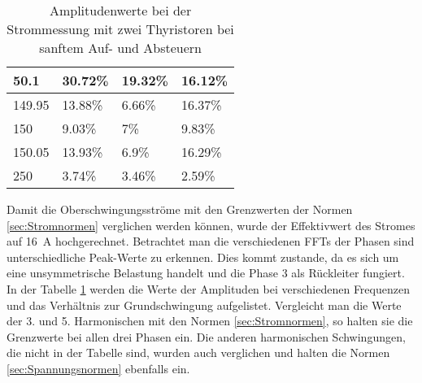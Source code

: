\begin{table}[ht]
\begin{tabular}{|l|l|l|l|}
		50.1              & 30.72\%                                                                             & 19.32\%                                                                             & 16.12\%                                                                             \\ \hline
		149.95            & 13.88\%                                                                             & 6.66\%                                                                              & 16.37\%                                                                             \\ \hline
		150               & 9.03\%                                                                              & 7\%                                                                                 & 9.83\%                                                                              \\ \hline
		150.05            & 13.93\%                                                                             & 6.9\%                                                                               & 16.29\%                                                                             \\ \hline
		250		          & 3.74\%                                                                             & 3.46\%                                                                               & 2.59\%                                                                             \\ \hline
	\end{tabular}
	\caption{Amplitudenwerte bei der Strommessung mit zwei Thyristoren bei sanftem Auf- und Absteuern}\label{tab:Mess_2Thyristoren_Spannung_Widerstand_AufAb_sanft_stroeme}
\end{table}

Damit die Oberschwingungsströme mit den  Grenzwerten der Normen \ref{sec:Stromnormen} verglichen werden können, wurde der Effektivwert des Stromes auf \SI{16}{A} hochgerechnet. Betrachtet man die verschiedenen FFTs der Phasen sind unterschiedliche Peak-Werte zu erkennen. Dies kommt zustande, da es sich um eine unsymmetrische Belastung handelt und die Phase 3 als Rückleiter fungiert. In der Tabelle \ref{tab:Mess_2Thyristoren_Spannung_Widerstand_AufAb_sanft_stroeme} werden die Werte der Amplituden bei verschiedenen Frequenzen und das Verhältnis zur Grundschwingung aufgelistet. Vergleicht man die Werte der 3. und 5. Harmonischen mit den Normen \ref{sec:Stromnormen}, so halten sie die Grenzwerte bei allen drei Phasen ein. Die anderen harmonischen Schwingungen, die nicht in der Tabelle sind, wurden auch verglichen und halten die Normen \ref{sec:Spannungsnormen} ebenfalls ein.

